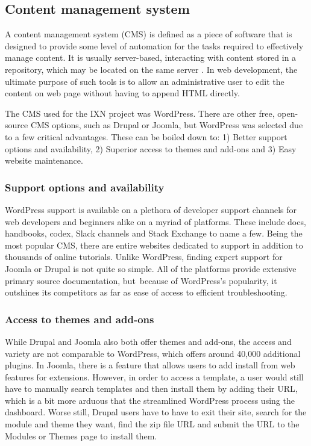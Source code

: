 \documentclass[fontsize=10pt]{extarticle}
\numberwithin{figure}{section} %
\begin{document}
\hypertarget{content-management-system}{%
\subsection{Content management system}\label{content-management-system}}

A content management system (CMS) is defined as a piece of software that
is designed to provide some level of automation for the tasks required
to effectively manage content. It is usually server-based, interacting
with content stored in a repository, which may be located on the same
server \cite{p1} . In web development, the ultimate purpose of such
tools is to allow an administrative user to edit the content on web page
without having to append HTML directly.

The CMS used for the IXN project was WordPress. There are other free,
open-source CMS options, such as Drupal or Joomla, but WordPress was
selected due to a few critical advantages. These can be boiled down to:
1) Better support options and availability, 2) Superior access to themes
and add-ons and 3) Easy website maintenance.~

\hypertarget{support-options-and-availability}{%
\subsubsection{Support options and
availability~}\label{support-options-and-availability}}

WordPress support is available on a plethora of developer support
channels for web developers and beginners alike on a myriad of
platforms. These include docs, handbooks, codex, Slack channels and
Stack Exchange to name a few. Being the most popular CMS, there are
entire websites dedicated to support in addition to thousands of online
tutorials. Unlike WordPress, finding expert support for Joomla or Drupal
is not quite so simple. All of the platforms provide extensive primary
source documentation, but~because of WordPress's popularity, it
outshines its competitors as far as ease of access to efficient
troubleshooting.~

\hypertarget{access-to-themes-and-add-ons}{%
\subsubsection{Access to themes and
add-ons~}\label{access-to-themes-and-add-ons}}

While Drupal and Joomla also both offer themes and add-ons, the access
and variety are not comparable to WordPress, which offers around 40,000
additional plugins. In Joomla, there is a feature that allows users to
add install from web features for extensions. However, in order to
access a template, a user would still have to manually search templates
and then install them by adding their URL, which is a bit more arduous
that the streamlined WordPress process using the dashboard. Worse still,
Drupal users have to have to exit their site, search for the module and
theme they want, find the zip file URL and submit the URL to the Modules
or Themes page to install them.~
\end{document}
